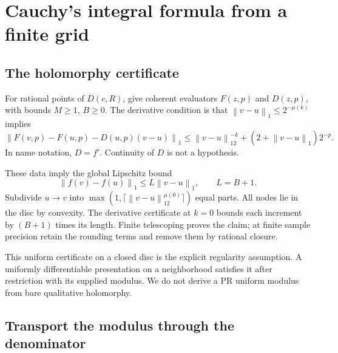 \documentclass[11pt]{article}
\theoremstyle{definition}
\newcommand{\norm}[1]{\left\lVert#1\right\rVert_1}
\newcommand{\clD}{\overline D}
\begin{document}
\section{Cauchy's integral formula from a finite grid}\label{sec:cauchy}

\subsection{The holomorphy certificate}\label{sec:cdata}

For rational points of \(\clD(c,R)\), give coherent evaluators \(F(z,p)\)
and \(D(z,p)\), with bounds \(M\ge1\), \(B\ge0\). The derivative condition
is that \(\norm{v-u}\le2^{-\mu(k)}\) implies
\begin{equation}
 \norm{F(v,p)-F(u,p)-D(u,p)(v-u)}
 \le \norm{v-u}2^{-k}+(2+\norm{v-u})2^{-p}.\label{eq:complexD}
\end{equation}
In name notation, \(D=f'\). Continuity of \(D\) is not a hypothesis.

These data imply the global Lipschitz bound
\begin{equation}\label{eq:Lf}
 \norm{f(v)-f(u)}\le L\norm{v-u},\qquad L=B+1.
\end{equation}
Subdivide \(u\to v\) into
\(\max(1,\lceil\norm{v-u}2^{\mu(0)}\rceil)\) equal parts.
All nodes lie in the disc by convexity. The derivative certificate at
\(k=0\) bounds each increment by \((B+1)\) times its length.
Finite telescoping proves the claim; at finite sample precision retain
the rounding terms and remove them by rational closure.

This uniform certificate on a closed disc is the explicit regularity
assumption. A uniformly differentiable presentation on a neighborhood
satisfies it after restriction with its supplied modulus. We do not
derive a PR uniform modulus from bare qualitative holomorphy.

\subsection{Transport the modulus through the denominator}
\end{document}
